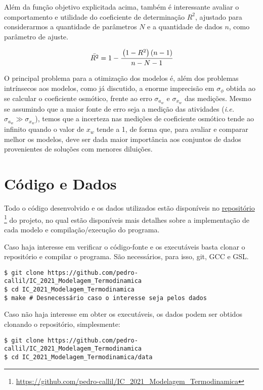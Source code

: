 \documentclass[
	12pt,				%
	openright,
	twoside,
	a4paper,			%
	english,			%
	french,				%
	spanish,			%
	brazil				%
	]{abntex2}
\begin{document}
Além da função objetivo explicitada acima, também é interessante avaliar o
comportamento e utilidade do coeficiente de determinação $R^2$, ajustado para
considerarmos a quantidade de parâmetros $N$ e a quantidade de dados $n$, como
parâmetro de ajuste.

\begin{equation}
	\bar{R^2} = 1 - \cfrac{\left( 1 - R^2 \right) \left( n - 1 \right)}
		{n - N - 1}
\end{equation}

O principal problema para a otimização dos modelos é, além dos problemas
intrínsecos aos modelos, como já discutido, a enorme imprecisão em
$\sigma_\phi$ obtida ao se calcular o coeficiente osmótico, frente ao erro
$\sigma_{a_w}$ e $\sigma_{x_w}$ das medições. Mesmo se assumindo que a maior
fonte de erro seja a medição das atividades (\textit{i.e.} $\sigma_{a_w} \gg
\sigma_{x_w}$), temos que a incerteza nas medições de coeficiente osmótico
tende ao infinito quando o valor de $x_w$ tende a 1, de forma que, para avaliar
e comparar melhor os modelos, deve ser dada maior importância aos conjuntos
de dados provenientes de soluções com menores diluições.

\chapter{Código e Dados}

Todo o código desenvolvido e os dados utilizados estão disponíveis no
\href{https://github.com/pedro-callil/IC_2021_Modelagem_Termodinamica}{repositório}
\footnote{\url{https://github.com/pedro-callil/IC_2021_Modelagem_Termodinamica}}
do projeto, no qual estão disponíveis mais detalhes sobre a implementação de
cada modelo e compilação/execução do programa.

Caso haja interesse em verificar o código-fonte e os executáveis basta clonar o
repositório e compilar o programa. São necessários, para isso, git, GCC e GSL.

\begin{verbatim}
$ git clone https://github.com/pedro-callil/IC_2021_Modelagem_Termodinamica
$ cd IC_2021_Modelagem_Termodinamica
$ make # Desnecessário caso o interesse seja pelos dados
\end{verbatim}

Caso não haja interesse em obter os executáveis, os dados podem ser obtidos
clonando o repositório, simplesmente:

\begin{verbatim}
$ git clone https://github.com/pedro-callil/IC_2021_Modelagem_Termodinamica
$ cd IC_2021_Modelagem_Termodinamica/data
\end{verbatim}
\end{document}
